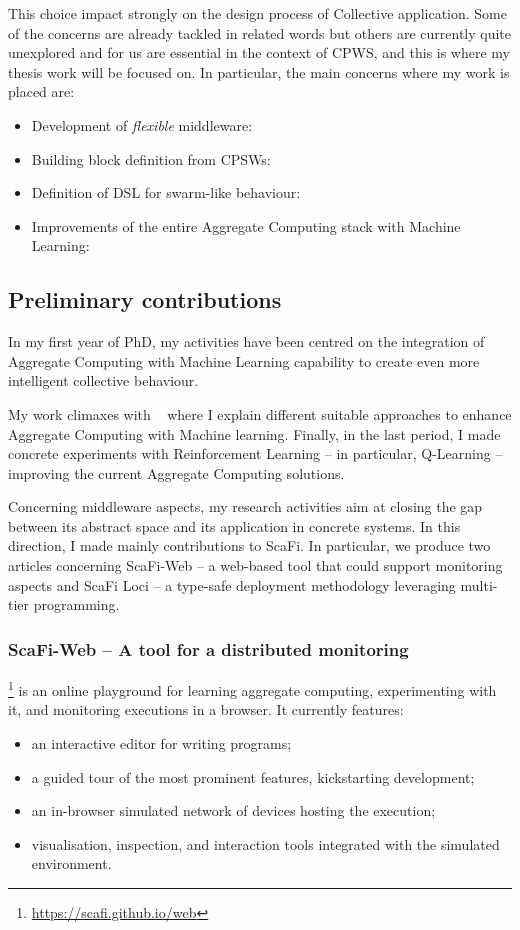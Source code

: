 \documentclass[11pt]{article}
\begin{document}
This choice impact strongly on the design process of Collective application. Some of the concerns are already tackled in related words but others are currently quite unexplored and for us are essential in the context of CPWS, and this is where my thesis work will be focused on.
In particular, the main concerns where my work is placed are:
\begin{itemize}
	\item Development of \textit{flexible} middleware:
	\item Building block definition from CPSWs:
	\item Definition of DSL for swarm-like behaviour:
	\item Improvements of the entire Aggregate Computing stack with Machine Learning:
\end{itemize}

\subsection{Preliminary contributions}
In my first year of PhD, my activities have been centred on
the integration of Aggregate Computing with Machine Learning capability to create even more
intelligent collective behaviour. 

My work climaxes with ~\cite{research} where I explain different suitable approaches to
enhance Aggregate Computing with Machine learning. Finally, in the last period, I made concrete
experiments with Reinforcement Learning -- in particular, Q-Learning \cite{} -- improving the current Aggregate Computing solutions.

Concerning middleware aspects, my research activities aim at closing the gap between
its abstract space and its application in concrete systems. In this direction, I made mainly contributions to ScaFi. In particular, we produce two articles concerning ScaFi-Web -- a web-based tool that could support monitoring aspects and ScaFi Loci -- a type-safe deployment methodology leveraging multi-tier programming.
\subsubsection{ScaFi-Web -- A tool for a distributed monitoring}
\scafiweb{}\footnote{\url{https://scafi.github.io/web}}
 is an online playground for learning aggregate computing, experimenting with it, and monitoring executions in a browser.
It currently features:
\begin{itemize}
 \item an interactive editor for writing \scafi{} programs;
 \item a guided tour of the most prominent features, kickstarting development;
 \item an in-browser simulated network of devices hosting the execution;
 \item visualisation, inspection, and interaction tools integrated with the simulated environment.
\end{itemize}
\end{document}
